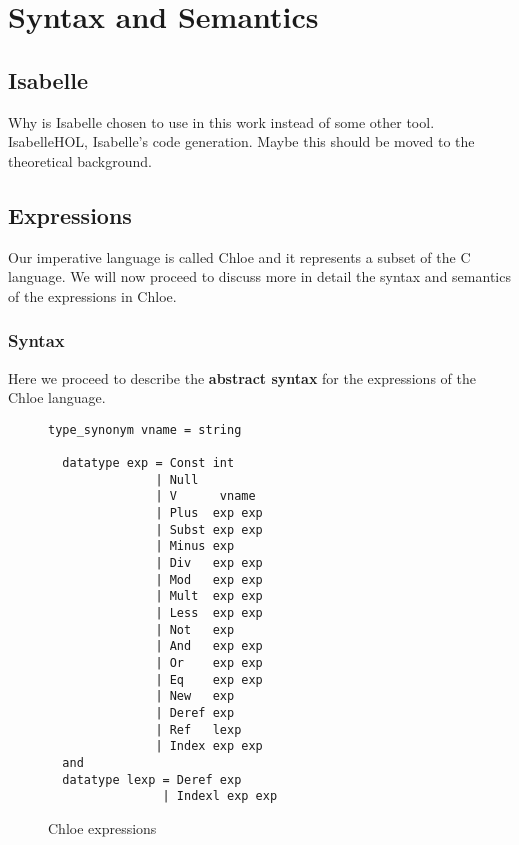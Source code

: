 \chapter{Syntax and Semantics}\label{chapter:semantics}

\section{Isabelle}\label{section:isabelle}

Why is Isabelle chosen to use in this work instead of some other tool.
IsabelleHOL, Isabelle's code generation.
Maybe this should be moved to the theoretical background.

\section{Expressions}\label{section:expressions}

Our imperative language is called Chloe and it represents a subset of the C language.
We will now proceed to discuss more in detail the syntax and semantics of the expressions in Chloe.

\subsection{Syntax}\label{subsection:syntax_expressions}

Here we proceed to describe the \textbf{abstract syntax} for the expressions of the Chloe language.

\begin{figure}
  \caption{Chloe expressions}
  \label{fig:chloe_expressions}

  \begin{lstlisting}[frame=single]
  type_synonym vname = string

  datatype exp = Const int
               | Null
               | V      vname
               | Plus  exp exp
               | Subst exp exp
               | Minus exp
               | Div   exp exp
               | Mod   exp exp
               | Mult  exp exp
               | Less  exp exp
               | Not   exp
               | And   exp exp
               | Or    exp exp
               | Eq    exp exp
               | New   exp
               | Deref exp
               | Ref   lexp
               | Index exp exp
  and
  datatype lexp = Deref exp
                | Indexl exp exp
  \end{lstlisting}
\end{figure}

